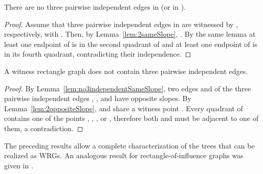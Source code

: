 \documentclass{llncs}
\begin{document}
\begin{lemma}
  \label{lem:no3independentSameSlope}
  There are no three pairwise independent edges in  (or in
  ).
\end{lemma}
\begin{proof} Assume that three pairwise independent edges  in  are witnessed by , respectively, with
  .  Then, by Lemma~\ref{lem:2sameSlope},
  .  By the same lemma at least one endpoint of
   is in the second quadrant of  and at least one endpoint
  of  is in its fourth quadrant, contradicting their independence. \hfill 
\end{proof} 















\begin{lemma}
  \label{lem:no3independent}
  A witness rectangle graph does not contain three pairwise independent edges.
\end{lemma}

\begin{proof}
  By Lemma~\ref{lem:no3independentSameSlope}, two edges  and 
  of the three pairwise independent edges , , and  have
  opposite slopes.  By Lemma~\ref{lem:2oppositeSlope},  and 
  share a witness point .  Every quadrant of  contains one of
  the points , , , or , therefore both  and  must be
  adjacent to one of them, a contradiction.  \hfill 
\end{proof}





The preceding results allow a complete characterization of the trees that can
be realized as WRGs. An analogous result for rectangle-of-influence graphs was
given in \cite{LLMW98}.
\end{document}
